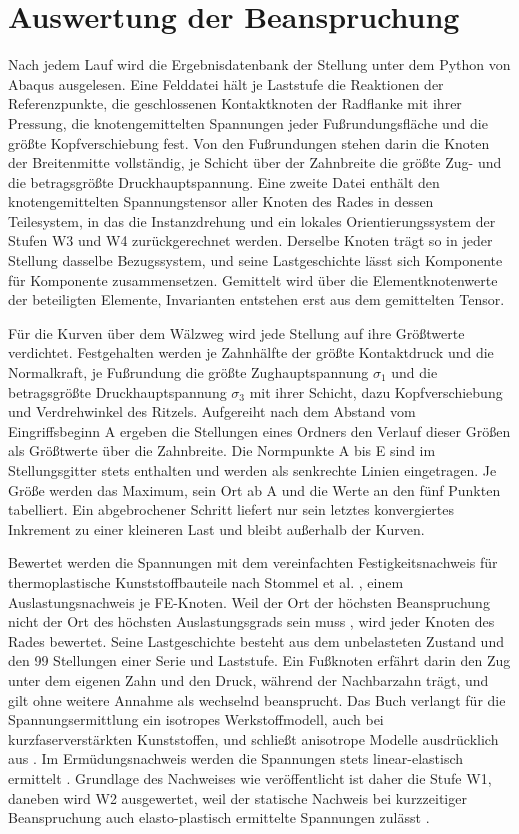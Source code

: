 \section{Auswertung der Beanspruchung}
\label{sec:auswertung_beanspruchung}

Nach jedem Lauf wird die Ergebnisdatenbank der Stellung unter dem Python von Abaqus ausgelesen. Eine Felddatei hält je Laststufe die Reaktionen der Referenzpunkte, die geschlossenen Kontaktknoten der Radflanke mit ihrer Pressung, die knotengemittelten Spannungen jeder Fußrundungsfläche und die größte Kopfverschiebung fest. Von den Fußrundungen stehen darin die Knoten der Breitenmitte vollständig, je Schicht über der Zahnbreite die größte Zug- und die betragsgrößte Druckhauptspannung. Eine zweite Datei enthält den knotengemittelten Spannungstensor aller Knoten des Rades in dessen Teilesystem, in das die Instanzdrehung und ein lokales Orientierungssystem der Stufen W3 und W4 zurückgerechnet werden. Derselbe Knoten trägt so in jeder Stellung dasselbe Bezugssystem, und seine Lastgeschichte lässt sich Komponente für Komponente zusammensetzen. Gemittelt wird über die Elementknotenwerte der beteiligten Elemente, Invarianten entstehen erst aus dem gemittelten Tensor.

Für die Kurven über dem Wälzweg wird jede Stellung auf ihre Größtwerte verdichtet. Festgehalten werden je Zahnhälfte der größte Kontaktdruck und die Normalkraft, je Fußrundung die größte Zughauptspannung $\sigma_{1}$ und die betragsgrößte Druckhauptspannung $\sigma_{3}$ mit ihrer Schicht, dazu Kopfverschiebung und Verdrehwinkel des Ritzels. Aufgereiht nach dem Abstand vom Eingriffsbeginn A ergeben die Stellungen eines Ordners den Verlauf dieser Größen als Größtwerte über die Zahnbreite. Die Normpunkte A bis E sind im Stellungsgitter stets enthalten und werden als senkrechte Linien eingetragen. Je Größe werden das Maximum, sein Ort ab A und die Werte an den fünf Punkten tabelliert. Ein abgebrochener Schritt liefert nur sein letztes konvergiertes Inkrement zu einer kleineren Last und bleibt außerhalb der Kurven.

Bewertet werden die Spannungen mit dem vereinfachten Festigkeitsnachweis für thermoplastische Kunststoffbauteile nach Stommel et al. \cite[Kap.~6]{Sto18}, einem Auslastungsnachweis je FE-Knoten. Weil der Ort der höchsten Beanspruchung nicht der Ort des höchsten Auslastungsgrads sein muss \cite[S.~313]{Sto18}, wird jeder Knoten des Rades bewertet. Seine Lastgeschichte besteht aus dem unbelasteten Zustand und den 99 Stellungen einer Serie und Laststufe. Ein Fußknoten erfährt darin den Zug unter dem eigenen Zahn und den Druck, während der Nachbarzahn trägt, und gilt ohne weitere Annahme als wechselnd beansprucht. Das Buch verlangt für die Spannungsermittlung ein isotropes Werkstoffmodell, auch bei kurzfaserverstärkten Kunststoffen, und schließt anisotrope Modelle ausdrücklich aus \cite[S.~343 bis 344]{Sto18}. Im Ermüdungsnachweis werden die Spannungen stets linear-elastisch ermittelt \cite[S.~362]{Sto18}. Grundlage des Nachweises wie veröffentlicht ist daher die Stufe W1, daneben wird W2 ausgewertet, weil der statische Nachweis bei kurzzeitiger Beanspruchung auch elasto-plastisch ermittelte Spannungen zulässt \cite[S.~343]{Sto18}.


